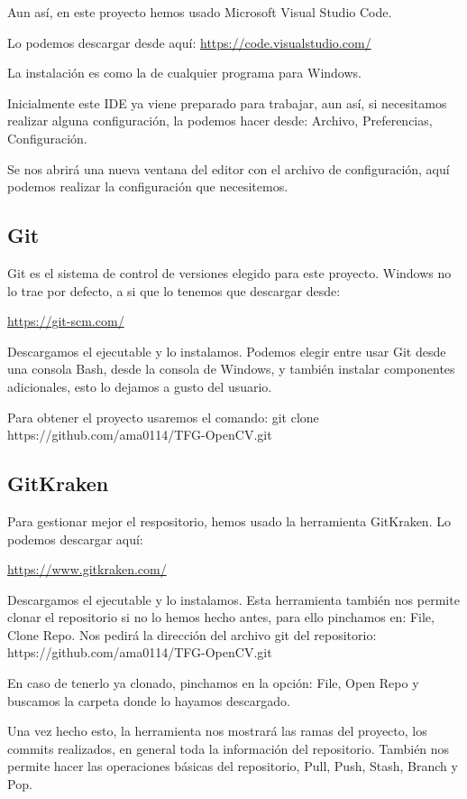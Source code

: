 Aun así, en este proyecto hemos usado Microsoft Visual Studio Code.

Lo podemos descargar desde aquí:
\url{https://code.visualstudio.com/}

La instalación es como la de cualquier programa para Windows.

Inicialmente este IDE ya viene preparado para trabajar, aun así, si necesitamos realizar alguna configuración, la podemos hacer desde: Archivo, Preferencias, Configuración.

Se nos abrirá una nueva ventana del editor con el archivo de configuración, aquí podemos realizar la configuración que necesitemos.

\subsection{Git}
Git es el sistema de control de versiones elegido para este proyecto. Windows no lo trae por defecto, a si que lo tenemos que descargar desde:

\url{https://git-scm.com/}

Descargamos el ejecutable y lo instalamos. Podemos elegir entre usar Git desde una consola Bash, desde la consola de Windows, y también instalar componentes adicionales, esto lo dejamos a gusto del usuario.

Para obtener el proyecto usaremos el comando: git clone https://github.com/ama0114/TFG-OpenCV.git

\subsection{GitKraken}
Para gestionar mejor el respositorio, hemos usado la herramienta GitKraken. Lo podemos descargar aquí:

\url{https://www.gitkraken.com/}

Descargamos el ejecutable y lo instalamos. Esta herramienta también nos permite clonar el repositorio si no lo hemos hecho antes, para ello pinchamos en: File, Clone Repo. Nos pedirá la dirección del archivo git del repositorio: https://github.com/ama0114/TFG-OpenCV.git

En caso de tenerlo ya clonado, pinchamos en la opción: File, Open Repo y buscamos la carpeta donde lo hayamos descargado.

Una vez hecho esto, la herramienta nos mostrará las ramas del proyecto, los commits realizados, en general toda la información del repositorio. También nos permite hacer las operaciones básicas del repositorio, Pull, Push, Stash, Branch y Pop.

